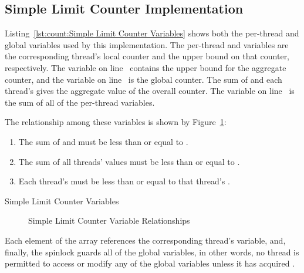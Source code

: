 \subsection{Simple Limit Counter Implementation}
\label{sec:count:Simple Limit Counter Implementation}

\begin{lineref}
Listing~\ref{lst:count:Simple Limit Counter Variables}
shows both the per-thread and global variables used by this
implementation.
The per-thread  and  variables are the
corresponding thread's local counter and the upper bound on that
counter, respectively.
The  variable on
line~ contains the upper
bound for the aggregate counter, and the  variable
on line~ is the global counter.
The sum of  and each thread's  gives
the aggregate value of the overall counter.
The  variable on
line~ is the sum of all of the
per-thread  variables.
\end{lineref}
The relationship among these variables is shown by
Figure~\ref{fig:count:Simple Limit Counter Variable Relationships}:
\begin{enumerate}
\item	The sum of  and  must
	be less than or equal to .
\item	The sum of all threads'  values must be
	less than or equal to .
\item	Each thread's  must be less than or equal to
	that thread's .
\end{enumerate}

\begin{listing}[tbp]

\caption{Simple Limit Counter Variables}
\label{lst:count:Simple Limit Counter Variables}
\end{listing}

\begin{figure}[tb]
\centering
{}
\caption{Simple Limit Counter Variable Relationships}
\label{fig:count:Simple Limit Counter Variable Relationships}
\end{figure}

Each element of the  array references the corresponding
thread's  variable, and, finally, the 
spinlock guards all of the global variables, in other words, no thread
is permitted to access or modify any of the global variables unless it
has acquired .

